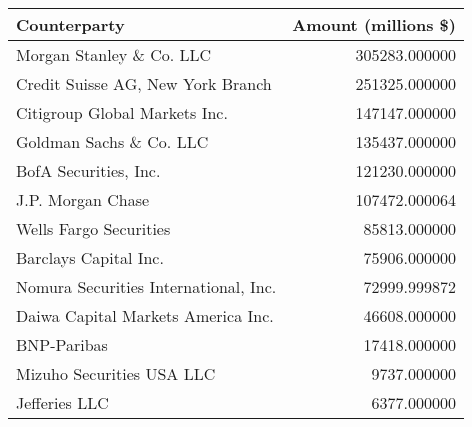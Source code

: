 \begin{tabular}{lr}
\toprule
                         Counterparty &  Amount (millions \$) \\
\midrule
             Morgan Stanley \& Co. LLC &        305283.000000 \\
    Credit Suisse AG, New York Branch &        251325.000000 \\
        Citigroup Global Markets Inc. &        147147.000000 \\
              Goldman Sachs \& Co. LLC &        135437.000000 \\
                BofA Securities, Inc. &        121230.000000 \\
                    J.P. Morgan Chase &        107472.000064 \\
               Wells Fargo Securities &         85813.000000 \\
                Barclays Capital Inc. &         75906.000000 \\
Nomura Securities International, Inc. &         72999.999872 \\
   Daiwa Capital Markets America Inc. &         46608.000000 \\
                          BNP-Paribas &         17418.000000 \\
            Mizuho Securities USA LLC &          9737.000000 \\
                        Jefferies LLC &          6377.000000 \\
\bottomrule
\end{tabular}
